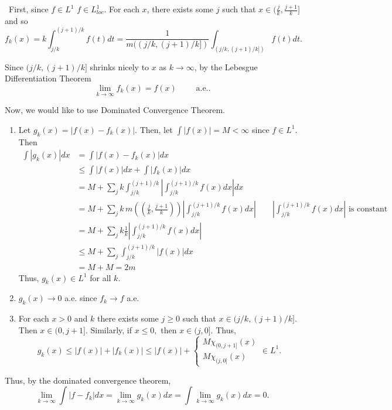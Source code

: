 \documentclass[12pt]{Homework}
\begin{document}
\begin{solution}$\,$
First, since $f\in L^1$ $f\in L_{loc}^1$. For each $x$, there exists some $j$ such that $x\in(\frac{j}{k},\frac{j+1}{k}]$ and so $$f_k(x)=k\int_{j/k}^{(j+1)/k}f(t)dt=\frac{1}{m((j/k,(j+1)/k])}\int_{(j/k,(j+1)/k])}f(t)dt.$$

Since $(j/k,(j+1)/k]$ shrinks nicely to $x$ as $k\to\infty$, by the Lebesgue Differentiation Theorem $$\lim_{k\to\infty}f_k(x)=f(x)\qquad\text{ a.e.}.$$

Now, we would like to use Dominated Convergence Theorem.
\begin{enumerate}
    \item Let $g_k(x)=|f(x)-f_k(x)|$. Then, let $\int|f(x)|=M<\infty$ since $f\in L^1$. Then \begin{align*}
        \int|g_k(x)|dx&=\int|f(x)-f_k(x)|dx\\
        &\le\int|f(x)|dx+\int|f_k(x)|dx\\
        &=M+\sum_jk\int_{j/k}^{(j+1)/k}\left|\int_{j/k}^{(j+1)/k}f(x)dx\right|dx\\
        &=M+\sum_jk\,m\left((\frac{j}{k},\frac{j+1}{k})\right)\left|\int_{j/k}^{(j+1)/k}f(x)dx\right|\qquad\left|\int_{j/k}^{(j+1)/k} f(x)dx\right|\text{ is constant}\\
        &=M+\sum_jk\frac{1}{k}\left|\int_{j/k}^{(j+1)/k}f(x)dx\right|\\
        &\le M+\sum_j\int_{j/k}^{(j+1)/k}|f(x)|dx\\
        &=M+M=2m
    \end{align*}
    Thus, $g_k(x)\in L^1$ for all $k$.
    \item $g_k(x)\to0$ a.e. since $f_k\to f$ a.e.
    \item For each $x>0$ and $k$ there exists some $j\ge0$ such that $x\in(j/k,(j+1)/k].$ Then $x\in(0,j+1]$. Similarly, if $x\le0,$ then $x\in(j,0]$. Thus, $$g_k(x)\le|f(x)|+|f_k(x)|\le |f(x)|+\begin{cases}
    M\chi_{(0,j+1]}(x)\\
    M\chi_{(j,0]}(x)
    \end{cases}\in L^1.$$
\end{enumerate}

Thus, by the dominated convergence theorem, $$\lim_{k\to\infty}\int|f-f_k|dx=\lim_{k\to\infty}g_k(x)dx=\int\lim_{k\to\infty}g_k(x)dx=0.$$
\end{solution}
\newpage
\end{document}
